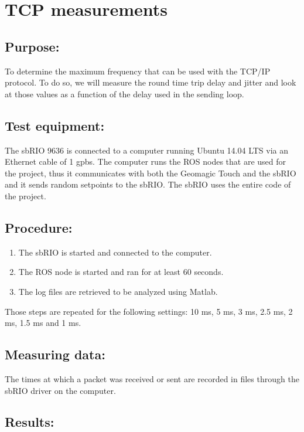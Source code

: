 \section{TCP measurements}\label{sec_tcp_mes}

\subsection*{Purpose:}

To determine the maximum frequency that can be used with the TCP/IP protocol. To do so, we will measure the round time trip delay and jitter and look at those values as a function of the delay used in the sending loop.

\subsection*{Test equipment:}

The sbRIO 9636 is connected to a computer running Ubuntu 14.04 LTS via an Ethernet cable of 1 gpbs. The computer runs the ROS nodes that are used for the project, thus it communicates with both the Geomagic Touch and the sbRIO and it sends random setpoints to the sbRIO. The sbRIO uses the entire code of the project.

\subsection*{Procedure:}

\begin{enumerate}
	\item The sbRIO is started and connected to the computer.
	\item The ROS node is started and ran for at least 60 seconds. 
	\item The log files are retrieved to be analyzed using Matlab.
\end{enumerate}
Those steps are repeated for the following settings: 10 ms, 5 ms, 3 ms, 2.5 ms, 2 ms, 1.5 ms and 1 ms.


\subsection*{Measuring data:}

The times at which a packet was received or sent are recorded in files through the sbRIO driver on the computer.

\subsection*{Results:}

